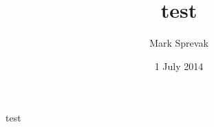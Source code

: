 \documentclass[a4paper,11pt]{article}
\title{test}
\author{Mark Sprevak}
\date{1 July 2014}
\begin{document}
\maketitle

\thispagestyle{empty}


test
\end{document}
